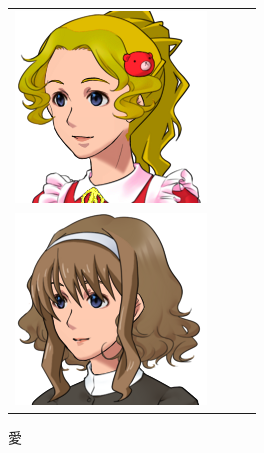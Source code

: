 \begin{figure}[b]
\begin{tabular}{cccc}
\begin{minipage}{0.2\textwidth}\includegraphics[width=\textwidth]{./jumpakuasset/B.png}\caption{永一}\label{fig:jumpakuH}\end{minipage}\\
\begin{minipage}{0.2\textwidth}\includegraphics[width=\textwidth]{./jumpakuasset/Me.png}\caption{愛}\label{fig:jumpakuI}\end{minipage}

\end{tabular}
\end{figure}

